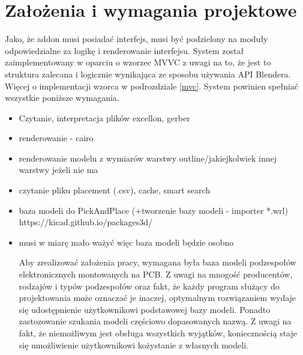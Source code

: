 \documentclass[brudnopis]{xmgr}
\begin{document}
\section{Założenia i wymagania projektowe}
Jako, że addon musi posiadać interfejs, musi być podzielony na moduły odpowiedzialne za logikę i renderowanie interfejsu. System został zaimplementowany w oparciu o wzorzec MVVC z uwagi na to, że jest to struktura zalecana i logicznie wynikająca ze sposobu używania API Blendera. Więcej o implementacji wzorca w podrozdziale \ref{mvc}.
System powinien spełniać wszystkie poniższe wymagania.
\begin{itemize}
\item Czytanie, interpretacja plików excellon, gerber

\item renderowanie - cairo
\item renderowanie modelu z wymiarów warstwy outline/jakiejkolwiek innej warstwy jeżeli nie ma
\item czytanie pliku placement (.csv), cache, smart search

\item baza modeli do PickAndPlace (+tworzenie bazy modeli - importer *.wrl) https://kicad.github.io/packages3d/
\item musi w miarę mało ważyć więc baza modeli będzie osobno

Aby zrealizować założenia pracy, wymagana była baza modeli podzespołów elektronicznych montowanych na PCB. Z uwagi na mnogość producentów, rodzajów i typów podzespołów oraz fakt, że każdy program służący do projektowania może oznaczać je inaczej, optymalnym rozwiązaniem wydaje się udostępnienie użytkownikowi podstawowej bazy modeli. Ponadto zastozowanie szukania modeli częściowo dopasowanych nazwą. Z uwagi na fakt, że niemożliwym jest obsługa wszystkich wyjątków, koniecznością staje się umożliwienie użytkownikowi kożystanie z własnych modeli.


\end{itemize}
\end{document}
